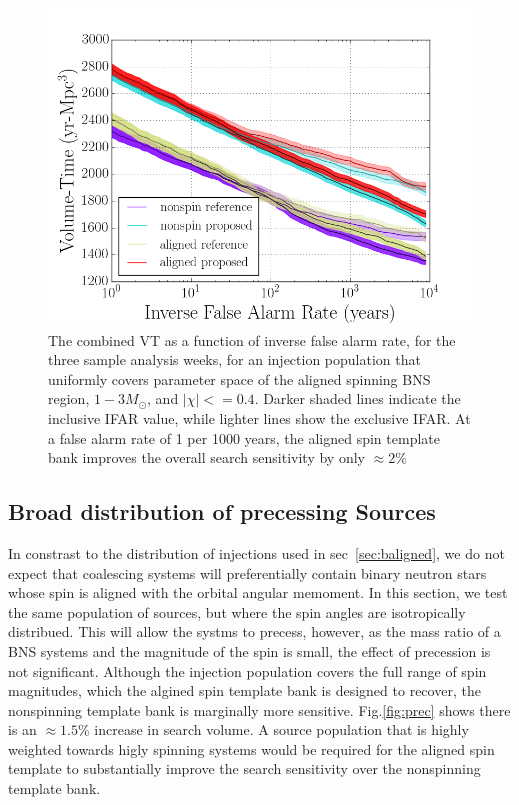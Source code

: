 \begin{figure}
\centering
\includegraphics[width=1.0\textwidth]{papers/bns_o1_dev/figures/aligned_combined.png}
\caption{\label{fig:aligned} 
The combined VT as a function of inverse false alarm rate, for the
three sample analysis weeks, for an injection population that uniformly covers parameter space of the aligned spinning BNS region, $1- 3M_\odot$, and $|\chi| <= 0.4$. Darker shaded lines indicate the inclusive IFAR value, while lighter lines show the exclusive IFAR. At a false alarm rate of 1 per 1000 years, the aligned spin template bank improves the overall search sensitivity by only $\approx 2\%$
}
\end{figure}

\subsection{Broad distribution of precessing Sources}

In constrast to the distribution of injections used in sec~\ref{sec:baligned}, we do not expect that coalescing systems will preferentially contain binary neutron stars whose spin is aligned with the orbital angular memoment. In this section, we test the same population of sources, but where the spin angles are isotropically distribued. This will allow the systms to precess, however, as the mass ratio of a BNS systems and the magnitude of the spin is small, the effect of precession is not significant. Although the injection population covers the full range of spin magnitudes, which the algined spin template bank is designed to recover, the nonspinning template bank is marginally more sensitive. Fig.\ref{fig:prec} shows there is an $\approx 1.5\%$ increase in search volume. A source population that is highly weighted towards higly spinning systems would be required for the aligned spin template to substantially improve the search sensitivity over the nonspinning template bank. 

